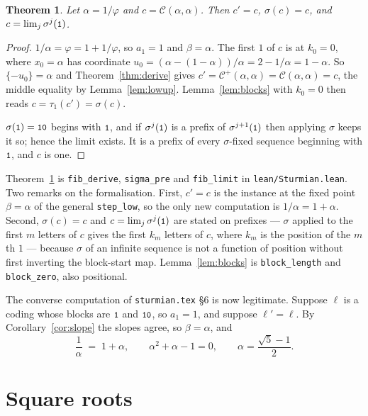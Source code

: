 \documentclass[11pt,a4paper]{article}
\newcommand{\seq}[1]{\texttt{\small #1}}
\newcommand{\C}{\mathcal{C}}
\newcommand{\Cp}{\mathcal{C}^{+}}
\theoremstyle{definition}
\theoremstyle{plain}
\newtheorem{theorem}[definition]{Theorem}
\begin{document}
\begin{theorem}\label{thm:fib}
Let $\alpha = 1/\varphi$ and $c = \C(\alpha,\alpha)$. Then $c' = c$,
$\sigma(c) = c$, and $c = \lim_j \sigma^j(\seq{1})$.
\end{theorem}

\begin{proof}
$1/\alpha = \varphi = 1 + 1/\varphi$, so $a_1 = 1$ and $\beta = \alpha$. The
first $1$ of $c$ is at $k_0 = 0$, where $x_0 = \alpha$ has coordinate
$u_0 = (\alpha - (1-\alpha))/\alpha = 2 - 1/\alpha = 1 - \alpha$. So
$\{-u_0\} = \alpha$ and Theorem~\ref{thm:derive} gives
$c' = \Cp(\alpha,\alpha) = \C(\alpha,\alpha) = c$, the middle equality by
Lemma~\ref{lem:lowup}. Lemma~\ref{lem:blocks} with $k_0 = 0$ then reads
$c = \tau_1(c') = \sigma(c)$.

$\sigma(\seq{1}) = \seq{10}$ begins with $\seq{1}$, and if $\sigma^j(\seq{1})$ is a
prefix of $\sigma^{j+1}(\seq{1})$ then applying $\sigma$ keeps it so; hence the
limit exists. It is a prefix of every $\sigma$-fixed sequence beginning with
$\seq{1}$, and $c$ is one.
\end{proof}

Theorem~\ref{thm:fib} is \texttt{fib\_derive}, \texttt{sigma\_pre} and
\texttt{fib\_limit} in \texttt{lean/Sturmian.lean}. Two remarks on the
formalisation. First, $c' = c$ is the instance at the fixed point $\beta =
\alpha$ of the general \texttt{step\_low}, so the only new computation is
$1/\alpha = 1 + \alpha$. Second, $\sigma(c) = c$ and $c = \lim_j
\sigma^j(\seq{1})$ are stated on prefixes --- $\sigma$ applied to the first $m$
letters of $c$ gives the first $k_m$ letters of $c$, where $k_m$ is the position
of the $m$th $1$ --- because $\sigma$ of an infinite sequence is not a function
of position without first inverting the block-start map. Lemma~\ref{lem:blocks}
is \texttt{block\_length} and \texttt{block\_zero}, also positional.

The converse computation of \texttt{sturmian.tex} \S6 is now legitimate. Suppose
$\ell$ is a coding whose blocks are $\seq{1}$ and $\seq{10}$, so $a_1 = 1$, and
suppose $\ell' = \ell$. By Corollary~\ref{cor:slope} the slopes agree, so
$\beta = \alpha$, and
\[
  \frac{1}{\alpha} \;=\; 1 + \alpha, \qquad \alpha^2 + \alpha - 1 = 0,
  \qquad \alpha = \frac{\sqrt 5 - 1}{2} .
\]

\section{Square roots}
\end{document}
